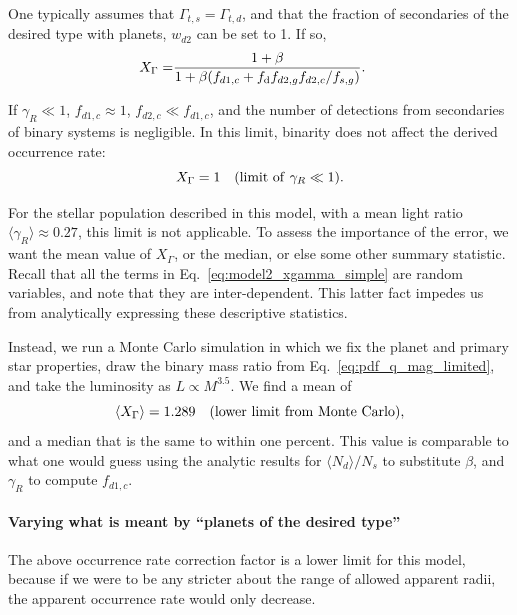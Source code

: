 \documentclass{emulateapj}
\begin{document}
One typically assumes that $\Gamma_{t,s}=\Gamma_{t,d}$, and that the 
fraction of secondaries of the desired type with planets, $w_{d2}$ can be set 
to 1.
If so,
\begin{align}
X_\Gamma =
&\frac{1+\beta}
{1 +\beta(f_{d1,c} + f_{\rm d}f_{d2,g}f_{d2,c}/f_{s,g})}.
\label{eq:model2_xgamma_simple}
\end{align}

If $\gamma_R \ll 1$, $f_{d1,c}\approx 1$, $f_{d2,c}\ll f_{d1,c}$, and the 
number of detections from secondaries of binary systems is negligible.
In this limit, binarity does not affect the derived occurrence rate:
\begin{equation}
X_\Gamma = 1 \quad ({\rm limit\ of}\ \gamma_R \ll 1).
\end{equation}

For the stellar population described in this model, with a mean light ratio 
$\langle \gamma_R \rangle \approx 0.27$, this limit is not applicable.
To assess the importance of the error, we want the mean
value of $X_\Gamma$, or the median, or else some other summary statistic.
Recall that all the terms in Eq.~\ref{eq:model2_xgamma_simple} are
random variables, and note that they are inter-dependent.
This latter fact impedes us from analytically expressing these 
descriptive statistics.

Instead, we run a Monte Carlo simulation in which we fix the planet and 
primary star properties, draw the binary mass ratio from 
Eq.~\ref{eq:pdf_q_mag_limited}, 
and take the luminosity as $L\propto M^{3.5}$. We find 
a mean of 
\begin{equation}
\langle X_\Gamma \rangle =1.289\quad ({\rm lower\ limit\ from\ Monte\ Carlo}),
\label{eq:X_Gamma_model2_lower}
\end{equation}
and a median that is the same to within one percent.
This value is comparable to what one would guess using the analytic results 
for $\langle N_d \rangle / N_s$ to substitute $\beta$, and $\gamma_R$ to 
compute $f_{d1,c}$.


\paragraph{Varying what is meant by ``planets of the desired type'' }
The above occurrence rate correction factor is a lower limit for this model, 
because if we were to be any stricter about the range of allowed apparent 
radii, the apparent occurrence rate would only decrease.
\end{document}

